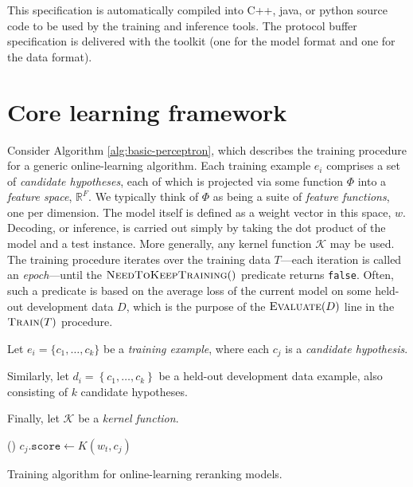 \documentclass[a4paper]{article}
\begin{document}
This specification is automatically compiled into C++, java, or python source code to be
used by the training and inference tools.  The protocol buffer specification is
delivered with the toolkit (one for the model format and one for the data
format).


\section{Core learning framework}

Consider Algorithm \ref{alg:basic-perceptron}, which describes the
training procedure for a generic online-learning algorithm. Each
training example $e_{i}$ comprises a set of \emph{candidate hypotheses},
each of which is projected via some function $\Phi$ into a \emph{feature
space}, $\mathbb{R}^{F}$. We typically think of $\Phi$ as being
a suite of \emph{feature functions}, one per dimension.\emph{ }The\emph{
}model itself is defined as a weight vector in this space, $w$. Decoding,
or inference, is carried out simply by taking the dot product of the
model and a test instance. More generally, any kernel function $\mathcal{K}$
may be used. The training procedure iterates over the training data
$T$---each iteration is called an \emph{epoch}---until the $\Call{NeedToKeepTraining}{}()$
predicate returns \texttt{false}. Often, such a predicate is based
on the average loss of the current model on some held-out development
data $D$, which is the purpose of the $\Call{Evaluate}{D}$ line
in the $\Call{Train}{T}$ procedure.

\begin{algorithm}
Let $e_{i}=\{c_{1},\ldots,c_{k}\}$ be a \emph{training example},
where each $c_{j}$ is a \emph{candidate hypothesis}.

Similarly, let $d_{i}=\left\{ c_{1},\ldots,c_{k}\right\} $ be a held-out
development data example, also consisting of $k$ candidate hypotheses.

Finally, let $\mathcal{K}$ be a \emph{kernel function}.

\renewcommand\algorithmicforall{\textbf{foreach}}
\begin{algorithmic}
\scriptsize
{}
    \State {}
    \State {}
  \EndWhile
\EndProcedure
\State
{}
    \State {}
      \State {}()
    \EndIf
  \EndFor
\EndProcedure
\State
{}
    \State $c_j.\texttt{score} \leftarrow K(w_t, c_j)$
  \EndFor
\EndProcedure
\normalsize
\end{algorithmic}

\caption{\label{alg:basic-perceptron}Training algorithm for online-learning
reranking models.}
\end{algorithm}
\end{document}
